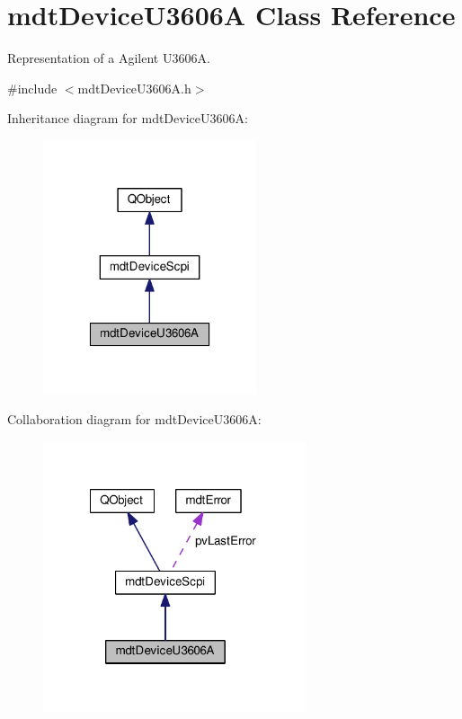 \hypertarget{classmdt_device_u3606_a}{\section{mdt\-Device\-U3606\-A Class Reference}
\label{classmdt_device_u3606_a}
}


Representation of a Agilent U3606\-A.  




{\ttfamily \#include $<$mdt\-Device\-U3606\-A.\-h$>$}



Inheritance diagram for mdt\-Device\-U3606\-A\-:
\nopagebreak
\begin{figure}[H]
\begin{center}
\leavevmode
\includegraphics[width=178pt]{classmdt_device_u3606_a__inherit__graph}
\end{center}
\end{figure}


Collaboration diagram for mdt\-Device\-U3606\-A\-:
\nopagebreak
\begin{figure}[H]
\begin{center}
\leavevmode
\includegraphics[width=218pt]{classmdt_device_u3606_a__coll__graph}
\end{center}
\end{figure}
